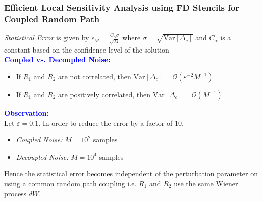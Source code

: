 \documentclass[a4paper,10pt]{beamer}
\newcommand{\sqb}[1]{\left[ #1 \right]}
\newcommand{\rb}[1]{\left( #1 \right)}
\begin{document}
	\begin{frame}
		\frametitle{\large Efficient Local Sensitivity Analysis using FD Stencils for Coupled Random Path}
		\textit{Statistical Error} is given by $\epsilon_{M} = \frac{C_{\alpha} \sigma}{\sqrt{M}}$ where $\sigma = \sqrt{\text{Var}\sqb{\Delta_{c}}}$ and $C_{\alpha}$ is a constant based on the confidence level of the solution \\
		\vspace{0.15cm}
		\textcolor{blue}{\textbf{Coupled vs. Decoupled Noise:}}
		\begin{itemize}
			\item {If $R_{1}$ and $R_{2}$ are not correlated, then $\text{Var}\sqb{\Delta_{c}} = \mathcal{O}\rb{\varepsilon^{-2} M^{-1}}$}
			\item {If $R_{1}$ and $R_{2}$ are positively correlated, then $\text{Var}\sqb{\Delta_{c}} = \mathcal{O}\rb{M^{-1}}$}
		\end{itemize}
		\textcolor{blue}{\textbf{Observation:}} \\
		Let $\varepsilon = 0.1$. In order to reduce the error by a factor of $10$.
		\begin{itemize}
			\item {\textit{Coupled Noise:} $M = 10^{2}$ samples}
			\item {\textit{Decoupled Noise:} $M = 10^{4}$ samples}
		\end{itemize}
		Hence the statistical error becomes independent of the perturbation parameter on using a common random path coupling i.e. $R_{1}$ and $R_{2}$ use the same Wiener process $dW$.
	\end{frame}
\end{document}
